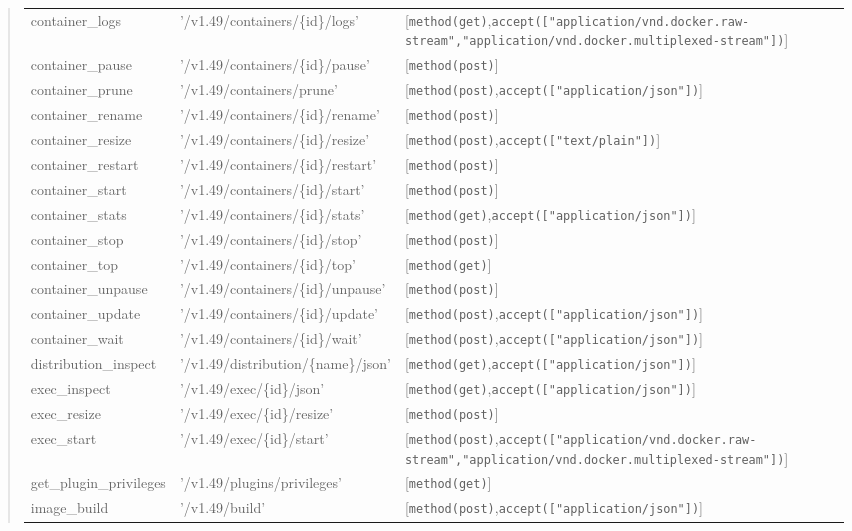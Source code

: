 \begin{description}
\begin{quote}
\begin{tabulary}{0.9\textwidth}{|l|L|L|}
container_logs & '/v1.49/containers/\{id\}/logs' & [\verb$method(get)$,\verb$accept(["application/vnd.docker.raw-stream","application/vnd.docker.multiplexed-stream"])$] \\
container_pause & '/v1.49/containers/\{id\}/pause' & [\verb$method(post)$] \\
container_prune & '/v1.49/containers/prune' & [\verb$method(post)$,\verb$accept(["application/json"])$] \\
container_rename & '/v1.49/containers/\{id\}/rename' & [\verb$method(post)$] \\
container_resize & '/v1.49/containers/\{id\}/resize' & [\verb$method(post)$,\verb$accept(["text/plain"])$] \\
container_restart & '/v1.49/containers/\{id\}/restart' & [\verb$method(post)$] \\
container_start & '/v1.49/containers/\{id\}/start' & [\verb$method(post)$] \\
container_stats & '/v1.49/containers/\{id\}/stats' & [\verb$method(get)$,\verb$accept(["application/json"])$] \\
container_stop & '/v1.49/containers/\{id\}/stop' & [\verb$method(post)$] \\
container_top & '/v1.49/containers/\{id\}/top' & [\verb$method(get)$] \\
container_unpause & '/v1.49/containers/\{id\}/unpause' & [\verb$method(post)$] \\
container_update & '/v1.49/containers/\{id\}/update' & [\verb$method(post)$,\verb$accept(["application/json"])$] \\
container_wait & '/v1.49/containers/\{id\}/wait' & [\verb$method(post)$,\verb$accept(["application/json"])$] \\
distribution_inspect & '/v1.49/distribution/\{name\}/json' & [\verb$method(get)$,\verb$accept(["application/json"])$] \\
exec_inspect & '/v1.49/exec/\{id\}/json' & [\verb$method(get)$,\verb$accept(["application/json"])$] \\
exec_resize & '/v1.49/exec/\{id\}/resize' & [\verb$method(post)$] \\
exec_start & '/v1.49/exec/\{id\}/start' & [\verb$method(post)$,\verb$accept(["application/vnd.docker.raw-stream","application/vnd.docker.multiplexed-stream"])$] \\
get_plugin_privileges & '/v1.49/plugins/privileges' & [\verb$method(get)$] \\
image_build & '/v1.49/build' & [\verb$method(post)$,\verb$accept(["application/json"])$] \\

\end{tabulary}
\end{quote}
\end{description}
